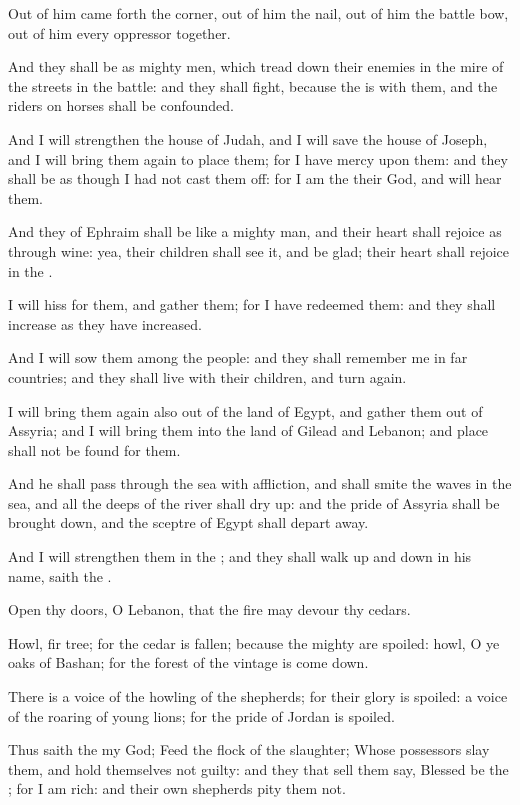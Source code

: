 \Verse Out of him came forth the corner, out of him the nail, out of him the battle bow, out of him every oppressor together.

\Verse And they shall be as mighty men, which tread down their enemies in the mire of the streets in the battle: and they shall fight, because the \LORD is with them, and the riders on horses shall be confounded.

\Verse And I will strengthen the house of Judah, and I will save the house of Joseph, and I will bring them again to place them; for I have mercy upon them: and they shall be as though I had not cast them off: for I am the \LORD their God, and will hear them.

\Verse And they of Ephraim shall be like a mighty man, and their heart shall rejoice as through wine: yea, their children shall see it, and be glad; their heart shall rejoice in the \LORD.

\Verse I will hiss for them, and gather them; for I have redeemed them: and they shall increase as they have increased.

\Verse And I will sow them among the people: and they shall remember me in far countries; and they shall live with their children, and turn again.

\Verse I will bring them again also out of the land of Egypt, and gather them out of Assyria; and I will bring them into the land of Gilead and Lebanon; and place shall not be found for them.

\Verse And he shall pass through the sea with affliction, and shall smite the waves in the sea, and all the deeps of the river shall dry up: and the pride of Assyria shall be brought down, and the sceptre of Egypt shall depart away.

\Verse And I will strengthen them in the \LORD; and they shall walk up and down in his name, saith the \LORD.


\Chapter
\Verse Open thy doors, O Lebanon, that the fire may devour thy cedars.

\Verse Howl, fir tree; for the cedar is fallen; because the mighty are spoiled: howl, O ye oaks of Bashan; for the forest of the vintage is come down.

\Verse There is a voice of the howling of the shepherds; for their glory is spoiled: a voice of the roaring of young lions; for the pride of Jordan is spoiled.

\Verse Thus saith the \LORD my God; Feed the flock of the slaughter; \Verse Whose possessors slay them, and hold themselves not guilty: and they that sell them say, Blessed be the \LORD; for I am rich: and their own shepherds pity them not.

